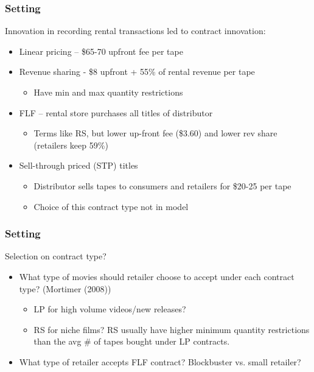 \begin{frame}
\frametitle{Setting}

Innovation in recording rental transactions led to contract innovation:

\begin{itemize}
\item Linear pricing -- \$65-70 upfront fee per tape

\item Revenue sharing - \$8 upfront + 55\% of rental revenue per tape

\begin{itemize}
\item Have min and max quantity restrictions
\end{itemize}

\item FLF -- rental store purchases all titles of distributor

\begin{itemize}
\item Terms like RS, but lower up-front fee (\$3.60) and lower rev share
(retailers keep 59\%)
\end{itemize}

\item Sell-through priced (STP) titles

\begin{itemize}
\item Distributor sells tapes to consumers and retailers for \$20-25 per tape

\item Choice of this contract type not in model
\end{itemize}
\end{itemize}
\end{frame}



\begin{frame}
\frametitle{Setting}

Selection on contract type?

\begin{itemize}
\item What type of movies should retailer choose to accept under each
contract type? (Mortimer (2008))

\begin{itemize}
\item LP for high volume videos/new releases?

\item RS for niche films? RS usually have higher minimum quantity
restrictions than the avg \# of tapes bought under LP contracts.
\end{itemize}

\item What type of retailer accepts FLF contract? Blockbuster vs. small
retailer?
\end{itemize}
\end{frame}


